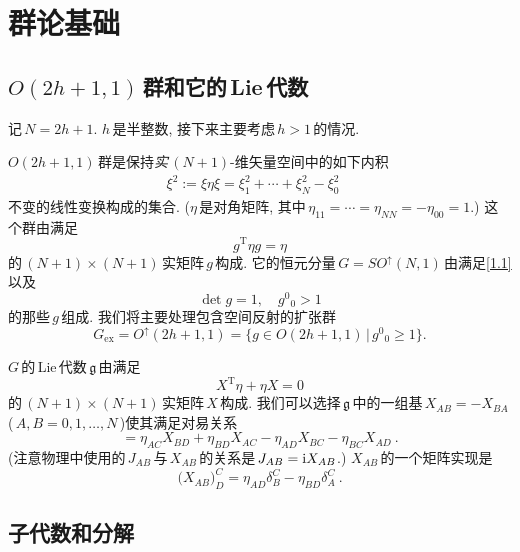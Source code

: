 \section{群论基础}

\subsection{\texorpdfstring{$O(2h{+}1,1)\,$}{O(2h+1,1)}群和它的\,Lie\,代数}

记$\,N = 2h{+}1$. $h\,$是半整数, 接下来主要考虑$\,h>1\,$的情况.

$O(2h{+}1,1)\,$群是保持{\it{实}}\,$(N{+}1)$-维矢量空间中的如下内积
\begin{gather}
    \xi^{2}:= \xi\eta\xi =\xi_{1}^{2}+\cdots +\xi_{N}^{2}-\xi_{0}^{2}\quad  \label{1.1} 
\end{gather}
不变的线性变换构成的集合. ($\eta\,$是对角矩阵, 其中$\,\eta_{11}=\cdots=\eta_{NN}=-\eta_{00}=1$.) 
这个群由满足
\begin{equation}
    g^{\mathrm{T}}\eta g =\eta 
\end{equation}
的$\,(N{+}1)\times (N{+}1)\,$实矩阵$\,g\,$构成. 它的恒元分量$\,G=SO^{\uparrow}(N,1)\,$由满足\eqref{1.1}以及
\begin{equation}
    \operatorname{det}g=1,\quad g^{0}{}_{0}>1
\end{equation}
的那些$\,g\,$组成. 我们将主要处理包含空间反射的扩张群
\begin{equation}
    G_{\text{ex}}=O^{\uparrow}(2h{+}1,1)=\{g\in O(2h{+}1,1)\,\vert\,g^{0}{}_{0}\geq 1\}.
\end{equation}

$G\,$的\,Lie\,代数$\,\mathfrak{g}\,$由满足
\begin{equation}
    X^{\mathrm{T}}\eta+\eta X=0 \label{1.5}
\end{equation}
的$\,(N{+}1)\times (N{+}1)\,$实矩阵$\,X\,$构成. 我们可以选择$\,\mathfrak{g}\,$中的一组基$\,X_{AB}=-X_{BA}$\,($\,A,B=0,1,\ldots,N\,$)使其满足对易关系
\begin{equation}
    [X_{AB},X_{CD}]=\eta_{AC}X_{BD}+\eta_{BD}X_{AC}-\eta_{AD}X_{BC}-\eta_{BC}X_{AD} \:.\label{1.6}
\end{equation}
(注意物理中使用的$\,J_{AB}\,$与$\,X_{AB}\,$的关系是$\,J_{AB}=\mathrm{i} X_{AB}$.) $X_{AB}\,$的一个矩阵实现是
\begin{equation}
    \bigl(X_{AB}\bigr)^{C}_{D}=\eta_{AD}\delta_{B}^{C}-\eta_{BD}\delta_{A}^{C}\:. \label{1.7}
\end{equation}

\subsection{子代数和分解}


